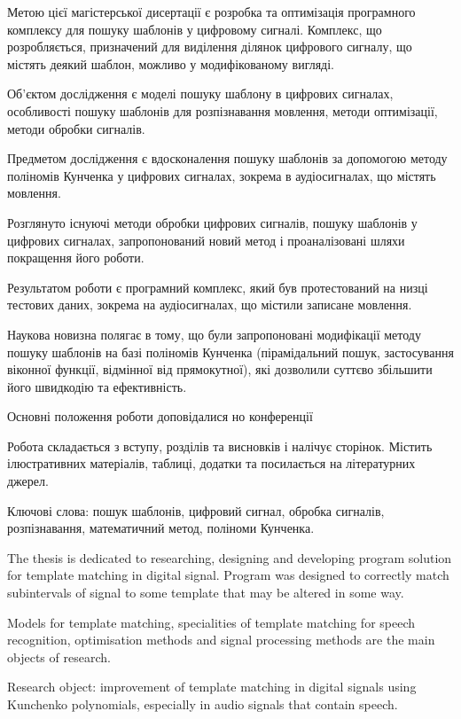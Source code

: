 Метою цієї магістерської дисертації є розробка та оптимізація програмного комплексу для пошуку шаблонів у цифровому
сигналі.
Комплекс, що розробляється, призначений для виділення ділянок цифрового сигналу, що містять деякий шаблон, можливо у
модифікованому вигляді.

Об’єктом дослідження є моделі пошуку шаблону в цифрових сигналах, особливості пошуку шаблонів для розпізнавання
мовлення, методи оптимізації, методи обробки сигналів.

Предметом дослідження є вдосконалення пошуку шаблонів за допомогою методу поліномів Кунченка у цифрових сигналах,
зокрема в аудіосигналах, що містять мовлення.

Розглянуто існуючі методи обробки цифрових сигналів, пошуку шаблонів у цифрових сигналах, запропонований новий метод і
проаналізовані шляхи покращення його роботи.

Результатом роботи є програмний комплекс, який був протестований на низці тестових даних, зокрема на аудіосигналах, що
містили записане мовлення.

Наукова новизна полягає в тому, що були запропоновані модифікації методу пошуку шаблонів на базі поліномів Кунченка
(пірамідальний пошук, застосування віконної функції, відмінної від прямокутної), які дозволили суттєво збільшити його
швидкодію та ефективність.

Основні положення роботи доповідалися но конференції 

Робота складається з вступу,   розділів та висновків і налічує  сторінок.
Містить  ілюстративних матеріалів,  таблиці,  додатки та
посилається на  літературних джерел.

Ключові слова: пошук шаблонів, цифровий сигнал, обробка сигналів, розпізнавання, математичний метод, поліноми
Кунченка.
\clearpage

The thesis is dedicated to researching, designing and developing program solution for template matching in digital signal.
Program was designed to correctly match subintervals of signal to some template that may be altered in some way.

Models for template matching, specialities of template matching for speech recognition, optimisation methods and
signal processing methods are the main objects of research.

Research object: improvement of template matching in digital signals using Kunchenko polynomials, especially in
audio signals that contain speech.

